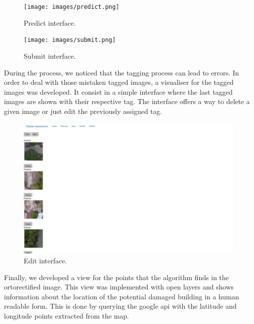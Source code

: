 \begin{figure}[h]
  \centering
  \texttt{[image: images/predict.png]}
  \caption{Predict interface.}
  \label{fig:predict}
\end{figure}


\begin{figure}[h]
  \centering
  \texttt{[image: images/submit.png]}
  \caption{Submit interface.}
  \label{fig:submit}
\end{figure}


During the process, we noticed that the tagging process can lead to errors. In order to deal with those mistaken tagged images, a visualiser for the tagged images was developed. It consist in a simple interface where the last tagged images are shown with their respective tag. The interface offers a way to delete a given image or just edit the previously assigned tag.

\begin{figure}[h]
  \centering
  \includegraphics[width=1\textwidth]{images/thumbnails.png}
  \caption{Edit interface.}
  \label{fig:thumbnails}
\end{figure}


Finally, we developed a view for the points that the algorithm finds in the ortorectified image. This view was implemented with open layers and shows information about the location of the potential damaged building in a human readable form. This is done by querying the google api with the latitude and longitude points extracted from the map.

